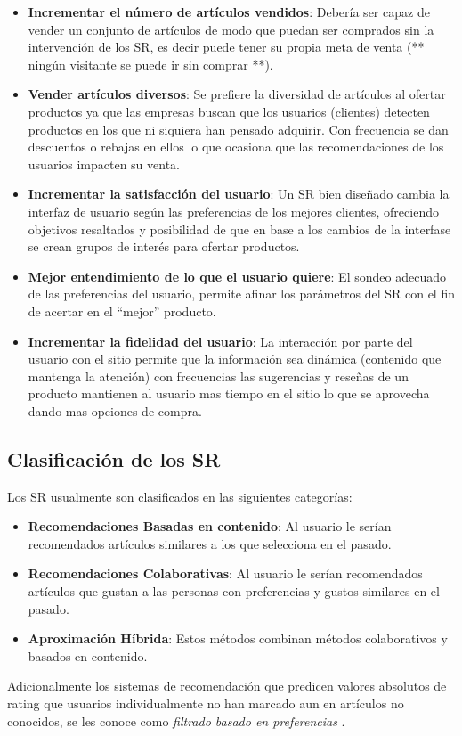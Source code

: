 \begin{itemize}
\item
  \textbf{Incrementar el número de artículos vendidos}: Debería ser capaz
  de vender un conjunto de artículos de modo que puedan ser comprados
  sin la intervención de los SR, es decir puede tener su propia meta de
  venta (** ningún visitante se puede ir sin comprar **).
\item
  \textbf{Vender artículos diversos}: Se prefiere la diversidad de
  artículos al ofertar productos ya que las empresas buscan que los
  usuarios (clientes) detecten productos en los que ni siquiera han
  pensado adquirir. Con frecuencia se dan descuentos o rebajas en ellos
  lo que ocasiona que las recomendaciones de los usuarios impacten su
  venta.
\item
  \textbf{Incrementar la satisfacción del usuario}: Un SR bien diseñado
  cambia la interfaz de usuario según las preferencias de los mejores
  clientes, ofreciendo objetivos resaltados y posibilidad de que en base
  a los cambios de la interfase se crean grupos de interés para ofertar
  productos.
\item
  \textbf{Mejor entendimiento de lo que el usuario quiere}: El sondeo
  adecuado de las preferencias del usuario, permite afinar los
  parámetros del SR con el fin de acertar en el ``mejor'' producto.
\item
  \textbf{Incrementar la fidelidad del usuario}: La interacción por
  parte del usuario con el sitio permite que la información sea dinámica
  (contenido que mantenga la atención) con frecuencias las sugerencias y
  reseñas de un producto mantienen al usuario mas tiempo en el sitio lo
  que se aprovecha dando mas opciones de compra.
\end{itemize}

\subsection{Clasificación de los SR}

Los SR usualmente son clasificados en las siguientes categorías:

\begin{itemize}

\item
  \textbf{Recomendaciones Basadas en contenido}: Al usuario le serían
  recomendados artículos similares a los que selecciona en el pasado.
\item
  \textbf{Recomendaciones Colaborativas}: Al usuario le serían
  recomendados artículos que gustan a las personas con preferencias y
  gustos similares en el pasado.
\item
  \textbf{Aproximación Híbrida}: Estos métodos combinan métodos
  colaborativos y basados en contenido.
\end{itemize}

Adicionalmente los sistemas de recomendación que predicen valores
absolutos de rating que usuarios individualmente no han marcado aun en
artículos no conocidos, se les conoce como \emph{filtrado basado en
preferencias }.